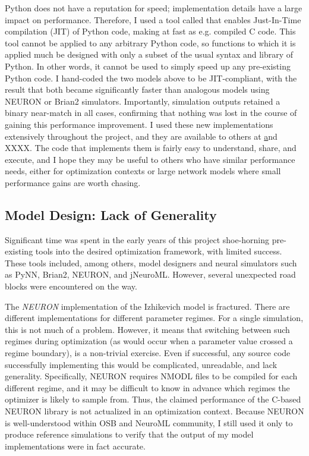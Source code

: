 Python does not have a reputation for speed; implementation details have a large impact on performance.
Therefore, I used a tool called \cite{numba} that enables Just-In-Time compilation (JIT) of Python code, making at fast as e.g. compiled C code.
This tool cannot be applied to any arbitrary Python code, so functions to which it is applied much be designed with only a subset of the usual syntax and library of Python.
In other words, it cannot be used to simply speed up any pre-existing Python code.
I hand-coded the two models above to be JIT-compliant, with the result that both became significantly faster than analogous models using NEURON or Brian2 simulators.
Importantly, simulation outputs retained a binary near-match in all cases, confirming that nothing was lost in the course of gaining this performance improvement.
I used these new implementations extensively throughout the project, and they are available to others at \href{https://github.com/russelljjarvis/IzhikevichModel} and XXXX.
The code that implements them is fairly easy to understand, share, and execute, and I hope they may be useful to others who have similar performance needs, either for optimization contexts or large network models where small performance gains are worth chasing.

\subsection{Model Design: Lack of Generality}
Significant time was spent in the early years of this project shoe-horning pre-existing tools into the desired optimization framework, with limited success.
These tools included, among others, model designers and neural simulators such as PyNN, Brian2, NEURON, and jNeuroML.
However, several unexpected road blocks were encountered on the way.

The \emph{NEURON} implementation of the Izhikevich model is fractured.
There are different implementations for different parameter regimes.
For a single simulation, this is not much of a problem.
However, it means that switching between such regimes during optimization (as would occur when a parameter value crossed a regime boundary), is a non-trivial exercise.
Even if successful, any source code successfully implementing this would be complicated, unreadable, and lack generality.
Specifically, NEURON requires NMODL files to be compiled for each different regime, and it may be difficult to know in advance which regimes the optimizer is likely to sample from.
Thus, the claimed performance of the C-based NEURON library is not actualized in an optimization context.
Because NEURON is well-understood within OSB and NeuroML community, I still used it only to produce reference simulations to verify that the output of my model implementations were in fact accurate.

